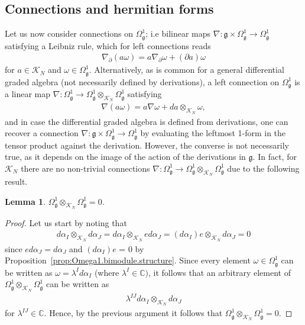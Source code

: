 \documentclass{amsart}
\newcommand{\complex}{\mathbb{C}}
\newtheorem{lemma}[theorem]{Lemma}
\theoremstyle{definition}
\theoremstyle{remark}
\numberwithin{equation}{section}
\newcommand{\K}{\mathcal{K}}
\newcommand{\KN}{\K_N}
\renewcommand{\d}{\partial}
\newcommand{\g}{\mathfrak{g}}
\newcommand{\Omegaoneg}{\Omega^1_{\g}}
\newcommand{\otimesKN}{\otimes_{\KN}}
\begin{document}
\subsection{Connections and hermitian forms}

Let us now consider connections on $\Omegaoneg$; i.e bilinear maps
$\nabla:\g\times\Omegaoneg\to\Omegaoneg$ satisfying a Leibniz rule,
which for left connections reads
\begin{align*}
  \nabla_\d (a\omega) = a\nabla_{\d}\omega + (\d a)\omega
\end{align*}
for $a\in\KN$ and $\omega\in\Omegaoneg$. Alternatively, as is common
for a general differential graded algebra (not necessarily defined by
derivations), a left connection on $\Omegaoneg$ is a linear map
$\nabla:\Omegaoneg\to\Omegaoneg\otimes_{\KN}\Omegaoneg$ satisfying
\begin{align*}
  \nabla(a\omega) = a\nabla\omega + da\otimes_{\KN}\omega,
\end{align*}
and in case the differential graded algebra is defined from
derivations, one can recover a connection
$\nabla:\g\times\Omegaoneg\to\Omegaoneg$ by evaluating the leftmost
1-form in the tensor product against the derivation.  However, the
converse is not necessarily true, as it depends on the image of the
action of the derivations in $\g$. In fact, for $\KN$ there are no
non-trivial connections
$\nabla:\Omegaoneg\to\Omegaoneg\otimes_{\KN}\Omegaoneg$ due to the
following result.

\begin{lemma}
  $\Omegaoneg\otimes_{\KN}\Omegaoneg=0$.
\end{lemma}

\begin{proof}
  Let us start by noting that
  \begin{align*}
    d\alpha_I\otimesKN d\alpha_J = d\alpha_I\otimesKN ed\alpha_J
    = (d\alpha_I)e\otimesKN d\alpha_J = 0
  \end{align*}
  since $ed\alpha_J=d\alpha_J$ and $(d\alpha_I)e$ = 0 by
  Proposition~\ref{prop:Omega1.bimodule.structure}. Since every element
  $\omega\in\Omegaoneg$ can be written as $\omega=\lambda^Id\alpha_I$
  (where $\lambda^I\in\complex)$, it follows that an arbitrary element
  of $\Omegaoneg\otimesKN\Omegaoneg$ can be written as
  \begin{align*}
    \lambda^{IJ}d\alpha_I\otimesKN d\alpha_J
  \end{align*}
  for $\lambda^{IJ}\in\complex$. Hence, by the previous argument it
  follows that $\Omegaoneg\otimesKN\Omegaoneg=0$.
\end{proof}
\end{document}
